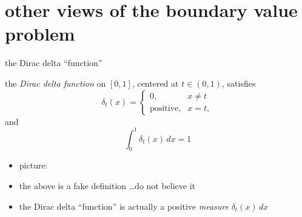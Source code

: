 \documentclass[10pt,
               svgnames,
               hyperref={colorlinks,
                         citecolor=DeepPink4,
                         linkcolor=FireBrick,
                         urlcolor=Maroon},
               usepdftitle=false]{beamer}
\begin{document}
\section{other views of the boundary value problem}

\begin{frame}{the Dirac delta ``function''}

\begin{definition}
the \emph{Dirac delta function} on $[0,1]$, centered at $t\in (0,1)$, satisfies
	$$\delta_t(x) = \begin{cases} 0, & x\ne t \\ \text{positive}, & x=t, \end{cases}$$
and
	$$\int_0^1 \delta_t(x) \, dx = 1$$
\end{definition}

\begin{itemize}
\item picture:

\vspace{20mm}
\item the above is a \alert{fake} definition \dots do not believe it
\item the Dirac delta ``function'' is actually a positive \emph{measure} $\delta_t(x)\,dx$
\end{itemize}
\end{frame}
\end{document}
